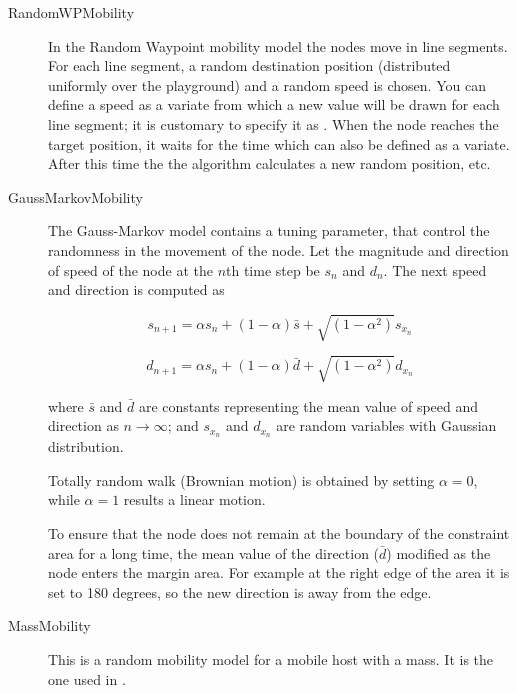 \begin{description}

\item[RandomWPMobility]

In the Random Waypoint mobility model the nodes move in line segments. For each
line segment, a random destination position (distributed uniformly over the
playground) and a random speed is chosen. You can define a speed as a variate
from which a new value will be drawn for each line segment; it is customary to
specify it as . When the node reaches the
target position, it waits for the time  which can also be defined as a
variate. After this time the the algorithm calculates a new random position, etc.

\item[GaussMarkovMobility] The Gauss-Markov model contains a tuning
parameter, that control the randomness in the movement of the node.
Let the magnitude and direction of speed of the node at the $n$th time step be
$s_n$ and $d_n$. The next speed and direction is computed as

$$ s_{n+1} = \alpha s_n + (1 - \alpha) \bar{s} +
             \sqrt{(1-\alpha^2)} s_{x_n} $$

$$ d_{n+1} = \alpha s_n + (1 - \alpha) \bar{d} +
             \sqrt{(1-\alpha^2)} d_{x_n} $$

where $\bar{s}$ and $\bar{d}$ are constants representing the mean value
of speed and direction as $n \to \infty$; and $s_{x_n}$ and $d_{x_n}$
are random variables with Gaussian distribution.

Totally random walk (Brownian motion) is obtained by setting $\alpha=0$,
while $\alpha=1$ results a linear motion.

To ensure that the node does not remain at the boundary of the constraint
area for a long time, the mean value of the direction ($\bar{d}$) modified
as the node enters the margin area. For example at the right edge of the
area it is set to 180 degrees, so the new direction is away from the edge.


\item[MassMobility] 

This is a random mobility model for a mobile host with
a mass. It is the one used in \cite{Perkins99optimizedsmooth}.


\end{description}
